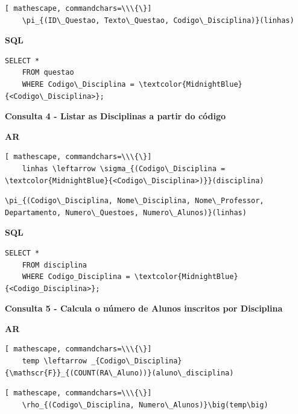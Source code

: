 \documentclass[12pt,a4paper]{article}
\begin{document}
\begin{Verbatim}[ mathescape, commandchars=\\\{\}]
    \pi_{(ID\_Questao, Texto\_Questao, Codigo\_Disciplina)}(linhas)
\end{Verbatim}

\begin{center}
    \textbf{SQL}
\end{center}
\begin{Verbatim}[commandchars=\\\{\}]
    SELECT * 
    FROM questao 
    WHERE Codigo\_Disciplina = \textcolor{MidnightBlue}{<Codigo\_Disciplina>};
\end{Verbatim}

\vspace{0.5cm}
\begin{center}
    \textbf{Consulta 4 - Listar as Disciplinas a partir do código }
\end{center}
\begin{center}
    \textbf{AR}
\end{center}

\begin{Verbatim}[ mathescape, commandchars=\\\{\}]
    linhas \leftarrow \sigma_{(Codigo\_Disciplina = \textcolor{MidnightBlue}{<Codigo\_Disciplina>)}}(disciplina)     
\end{Verbatim}

\begin{Verbatim}[mathescape, commandchars=\\\{\}]
    \pi_{(Codigo\_Disciplina, Nome\_Disciplina, Nome\_Professor, Departamento, Numero\_Questoes, Numero\_Alunos)}(linhas)
\end{Verbatim}

\begin{center}
    \textbf{SQL}
\end{center}
\begin{Verbatim}[commandchars=\\\{\}]
    SELECT * 
    FROM disciplina 
    WHERE Codigo_Disciplina = \textcolor{MidnightBlue}{<Codigo_Disciplina>};
\end{Verbatim}

\vspace{0.5cm}
\begin{center}
    \textbf{Consulta 5 - Calcula o número de Alunos inscritos por Disciplina}
\end{center}
\begin{center}
    \textbf{AR}
\end{center}
\begin{Verbatim}[ mathescape, commandchars=\\\{\}]
    temp \leftarrow _{Codigo\_Disciplina}{\mathscr{F}}_{(COUNT(RA\_Aluno))}(aluno\_disciplina)
\end{Verbatim}
\begin{Verbatim}[ mathescape, commandchars=\\\{\}]
    \rho_{(Codigo\_Disciplina, Numero\_Alunos)}\big(temp\big)
\end{Verbatim}
\end{document}
